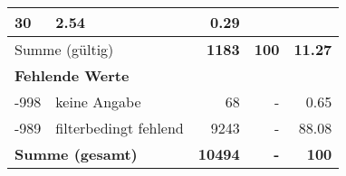 \begin{longtable}{lXrrr}
       \num{30} &
       \num[round-mode=places,round-precision=2]{2.54} &
         \num[round-mode=places,round-precision=2]{0.29} \\
     \midrule
     \multicolumn{2}{l}{Summe (gültig)} &
       \textbf{\num{1183}} &
     \textbf{\num{100}} &
       \textbf{\num[round-mode=places,round-precision=2]{11.27}} \\
     \multicolumn{5}{l}{\textbf{Fehlende Werte}}\\
       -998 &
       keine Angabe &
         \num{68} &
        - &
         \num[round-mode=places,round-precision=2]{0.65} \\
       -989 &
       filterbedingt fehlend &
         \num{9243} &
        - &
         \num[round-mode=places,round-precision=2]{88.08} \\
     \midrule
     \multicolumn{2}{l}{\textbf{Summe (gesamt)}} &
          \textbf{\num{10494}} &
        \textbf{-} &
        \textbf{\num{100}} \\
     \bottomrule
     \end{longtable}
     
